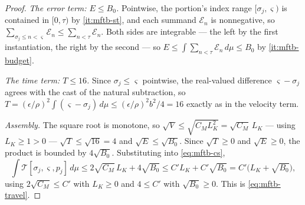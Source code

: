 \begin{proof}
\emph{The error term: $E\le B_0$.} Pointwise, the portion's index range
$[\sigma_j,\varsigma)$ is contained in $[0,\tau)$ by \ref{it:mftb-st}, and each
summand $\mathcal E_n$ is nonnegative, so
$\sum_{\sigma_j\le n<\varsigma}\mathcal E_n\le\sum_{n<\tau}\mathcal E_n$. Both
sides are integrable --- the left by the first instantiation, the right by the
second --- so $E\le\int\sum_{n<\tau}\mathcal E_n\,d\mu\le B_0$ by
\ref{it:mftb-budget}.

\emph{The time term: $T\le16$.} Since $\sigma_j\le\varsigma$ pointwise, the
real-valued difference $\varsigma-\sigma_j$ agrees with the cast of the natural
subtraction, so
$T=(\epsilon/\rho)^2\int(\varsigma-\sigma_j)\,d\mu\le(\epsilon/\rho)^2b^2/4=16$
exactly as in the velocity term.

\emph{Assembly.} The square root is monotone, so
$\sqrt V\le\sqrt{C_ML_K^2}=\sqrt{C_M}\,L_K$ --- using $L_K\ge1>0$ ---
$\sqrt T\le\sqrt{16}=4$ and $\sqrt E\le\sqrt{B_0}$. Since
$\sqrt T\ge0$ and $\sqrt E\ge0$, the product is bounded by
$4\sqrt{B_0}$. Substituting into \eqref{eq:mftb-cs},
\[
  \int\mathcal T[\sigma_j,\varsigma,p_j]\,d\mu
   \le2\sqrt{C_M}\,L_K+4\sqrt{B_0}
   \le C'L_K+C'\sqrt{B_0}
   =C'\bigl(L_K+\sqrt{B_0}\bigr),
\]
using $2\sqrt{C_M}\le C'$ with $L_K\ge0$ and $4\le C'$ with
$\sqrt{B_0}\ge0$. This is \eqref{eq:mftb-travel}.
\end{proof}
